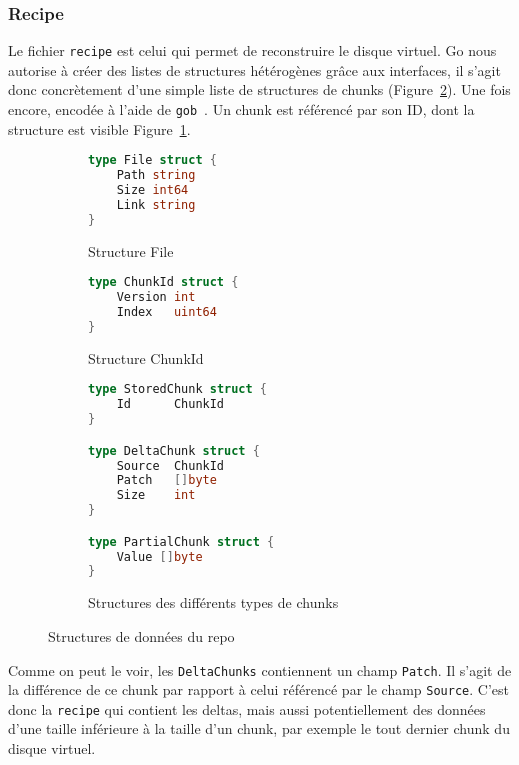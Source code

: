\documentclass[a4paper]{report}
\begin{document}
\subsubsection{Recipe}
Le fichier \verb|recipe| est celui qui permet de reconstruire le disque virtuel.
Go nous autorise à créer des listes de structures hétérogènes grâce aux interfaces,
il s'agit donc concrètement d'une simple liste de structures de chunks (Figure~\ref{fig:type-chunks-struct}).
Une fois encore, encodée à l'aide de \verb|gob|~\cite{pike2011gob}.
Un chunk est référencé par son ID, dont la structure est visible Figure~\ref{fig:type-chunkid-struct}.

\begin{figure}[ht]
\centering
\begin{subfigure}[t]{.45\textwidth}
\begin{lstlisting}[language=Go]
type File struct {
    Path string
    Size int64
    Link string
}
\end{lstlisting}
\caption{Structure File}
\label{fig:type-file-struct}
\hfill
\begin{lstlisting}[language=Go]
type ChunkId struct {
    Version int
    Index   uint64
}
\end{lstlisting}
\caption{Structure ChunkId}
\label{fig:type-chunkid-struct}
\end{subfigure}
\hfil
\begin{subfigure}[t]{.45\textwidth}
\begin{lstlisting}[language=Go]
type StoredChunk struct {
    Id      ChunkId
}

type DeltaChunk struct {
    Source  ChunkId
    Patch   []byte
    Size    int
}

type PartialChunk struct {
    Value []byte
}
\end{lstlisting}
\caption{Structures des différents types de chunks\protect\footnotemark}
\label{fig:type-chunks-struct}
\end{subfigure}
\caption{Structures de données du repo}
\label{fig:repo-type-struct}
\end{figure}

Comme on peut le voir, les \verb|DeltaChunks| contiennent un champ \verb|Patch|.
Il s'agit de la différence de ce chunk par rapport à celui référencé par le champ \verb|Source|.
C'est donc la \verb|recipe| qui contient les deltas,
mais aussi potentiellement des données d'une taille inférieure à la taille d'un chunk,
par exemple le tout dernier chunk du disque virtuel.
\end{document}
